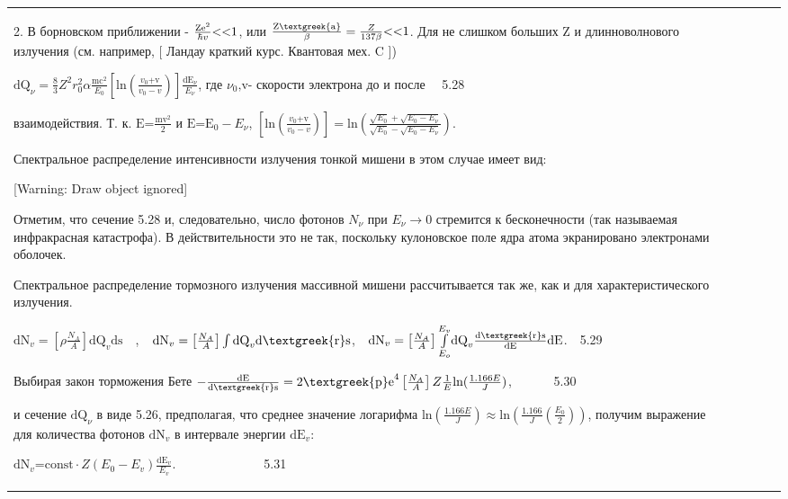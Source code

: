 \documentclass[a4paper,14pt, openany, twoside, draft]{extbook} %
\begin{document}
\begin{flushleft}
\begin{supertabular}{|m{1.7279999cm}|m{1.522cm}|m{1.522cm}|m{1.522cm}|m{1.744cm}|}
2. В борновском приближении -  $\frac{{\text{Ze}}^2}{\hbar v}\text{{\textless}{\textless}1}$, или  $\frac{{\text{Z\textgreek{a}}}}{\beta }=\frac Z{137\beta }\text{{\textless}{\textless}1}$. Для не слишком больших Z и длинноволнового излучения (см. например, [ Ландау краткий курс. Квантовая мех. C ])

 ${\text{dQ}}_{\nu }=\frac 8 3Z^2r_0^2\alpha \frac{{\text{mc}}^2}{E_0}\left[\text{ln}(\frac{v_0{\text{+v}}}{v_0-v})\right]\frac{{\text{dE}}_{\nu }}{E_{\nu }}$, где  $\nu _0{\text{,v}}${}- скорости электрона до и после \ \ 5.28

взаимодействия. Т. к.  ${\text{E=}}\frac{{\text{mv}}^2} 2$ и  ${\text{E=E}}_0-E_{\nu }$,   $\left[\text{ln}(\frac{v_0{\text{+v}}}{v_0-v})\right]=\text{ln}(\frac{\sqrt{E_0}+\sqrt{E_0-E_{\nu }}}{\sqrt{E_0}-\sqrt{E_0-E_{\nu }}})$.

Спектральное распределение интенсивности излучения тонкой мишени в этом случае имеет вид:

[Warning: Draw object ignored]

Отметим, что сечение 5.28 и, следовательно, число фотонов  $N_{\nu }$ при  $E_{\nu }\rightarrow 0$ стремится к бесконечности (так называемая инфракрасная катастрофа). В действительности это не так, поскольку кулоновское поле ядра атома экранировано электронами оболочек.

Спектральное распределение тормозного излучения массивной мишени рассчитывается так же, как и для характеристического излучения.

 ${\text{dN}}_v=\left[\rho \frac{N_A} A\right]{\text{dQ}}_v{\text{ds}}$\ \ ,\ \  ${\text{dN}}_v=\left[\frac{N_A} A\right]\int {\text{dQ}}_v{\text{d\textgreek{r}s}}$,\ \  ${\text{dN}}_v=\left[\frac{N_A} A\right]\overset{E_v}{\underset{E_o}{\int }}{\text{dQ}}_v\frac{{\text{d\textgreek{r}s}}}{{\text{dE}}}{\text{dE}}$.\ \ 5.29

Выбирая закон торможения Бете  $-\frac{{\text{dE}}}{{\text{d\textgreek{r}s}}}=2{\text{\textgreek{p}e}}^4\left[\frac{N_A} A\right]Z\frac 1 E\text{ln}(\frac{1.166E} J)$, \ \ \ \ \ \ 5.30

и сечение  ${\text{dQ}}_{\nu }$ в виде 5.26, предполагая, что среднее значение логарифма  $\text{ln}(\frac{1.166E} J)\approx \text{ln}(\frac{1.166} J(\frac{E_0} 2))$, получим выражение для количества фотонов  ${\text{dN}}_v$ в интервале энергии  ${\text{dE}}_v$:

 ${\text{dN}}_v{\text{=const}}\cdot Z(E_0-E_v)\frac{{\text{dE}}_v}{E_v}$.\ \ \ \ \ \ \ \ \ \ \ \ \ \ 5.31


\end{supertabular}
\end{flushleft}
\end{document}
